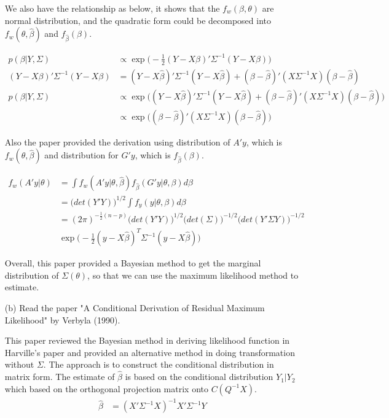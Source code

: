\begin{itemize}
We also have the relationship as below, it shows that the $f_w(\beta, \theta)$ are normal distribution, and the quadratic form could be decomposed into $f_w(\theta, \hat{\beta})$ and $f_{\hat{\beta}}(\beta)$. 

 \begin{align*}
    p(\beta | Y, \Sigma) & \propto \exp \Big( -\frac{1}{2} (Y- X {\beta})' \Sigma^{-1} (Y- X {\beta})  \Big) \\
    (Y- X \beta)' \Sigma^{-1} (Y- X \beta)  &= (Y- X \hat{\beta})' \Sigma^{-1} (Y- X \hat{\beta}) + (\beta - \hat{\beta})' (X \Sigma^{-1}X) (\beta - \hat{\beta})\\
    p(\beta | Y, \Sigma) & \propto \exp \Big((Y- X \hat{\beta})' \Sigma^{-1} (Y- X \hat{\beta}) + (\beta - \hat{\beta})' (X \Sigma^{-1}X) (\beta - \hat{\beta}) \Big) \\
    & \propto \exp \Big( (\beta - \hat{\beta})' (X \Sigma^{-1}X) (\beta - \hat{\beta}) \Big) 
\end{align*}

Also the paper provided the derivation using distribution of $A'y $, which is $f_w(\theta, \hat{\beta})$ and distribution for $G'y$, which is $f_{\hat{\beta}}(\beta)$. 

 \begin{align*}
    f_w(A' y| \theta) &= \int f_w(A' y| \theta, \hat{\beta}) f_{\hat{\beta}} (G'y | \theta, \beta) d\beta \\ 
    &= \Big(det(Y'Y) \Big)^{1/2} \int f_y(y| \theta, \beta) d\beta \\
    &= (2\pi)^{-\frac{1}{2} (n-p)}  \Big(det(Y'Y) \Big)^{1/2}  \Big(det(\Sigma) \Big)^{-1/2}  \Big(det(Y' \Sigma Y) \Big)^{-1/2} \\
    & \exp \Big(-\frac{1}{2} (y- X \hat{\beta})^T \Sigma^{-1} (y- X \hat{\beta}) \Big)
\end{align*}

Overall, this paper provided a Bayesian method to get the marginal distribution of $\Sigma(\theta)$, so that we can use the maximum likelihood method to estimate.

\item[(b)] Read the paper "A Conditional Derivation of Residual Maximum Likelihood" by Verbyla (1990).

This paper reviewed the Bayesian method in deriving likelihood function in Harville's paper and provided an alternative method in doing transformation without $\Sigma$. The approach is to construct the conditional distribution in matrix form. The estimate of $\hat{\beta}$ is based on the conditional distribution $Y_1|Y_2$ which based on the orthogonal projection matrix onto $C(Q^{-1}X)$.
 \begin{align*}
    \hat{\beta} &= (X' \Sigma^{-1} X)^{-1} X' \Sigma^{-1} Y
\end{align*}


\end{itemize}
